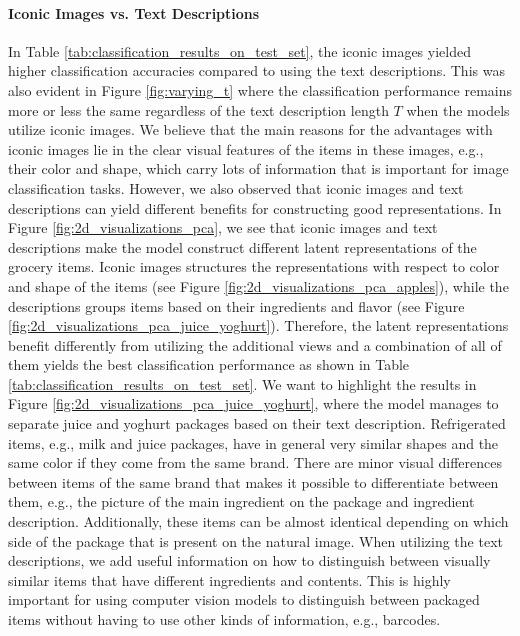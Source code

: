 \paragraph{Iconic Images vs. Text Descriptions} 
In Table \ref{tab:classification_results_on_test_set}, the iconic images yielded higher classification accuracies compared to using the text descriptions. This was also evident in Figure \ref{fig:varying_t} where the classification performance remains more or less the same regardless of the text description length $T$ when the models utilize iconic images. We believe that the main reasons for the advantages with iconic images lie in the clear visual features of the items in these images, e.g., their color and shape, which carry lots of information that is important for image classification tasks. However, we also observed that iconic images and text descriptions can yield different benefits for constructing good representations. In Figure \ref{fig:2d_visualizations_pca}, we see that iconic images and text descriptions make the model construct different latent representations of the grocery items. Iconic images structures the representations with respect to color and shape of the items (see Figure \ref{fig:2d_visualizations_pca_apples}), while the descriptions groups items based on their ingredients and flavor (see Figure \ref{fig:2d_visualizations_pca_juice_yoghurt}). Therefore, the latent representations benefit differently from utilizing the additional views and a combination of all of them yields the best classification performance as shown in Table \ref{tab:classification_results_on_test_set}. We want to highlight the results in Figure \ref{fig:2d_visualizations_pca_juice_yoghurt}, where the model manages to separate juice and yoghurt packages based on their text description. 
Refrigerated items, e.g., milk and juice packages, have in general very similar shapes and the same color if they come from the same brand.
There are minor visual differences between items of the same brand that makes it possible to differentiate between them, e.g., the picture of the main ingredient on the package and ingredient description. Additionally, these items can be almost identical depending on which side of the package that is present on the natural image. When utilizing the text descriptions, we add useful information on how to distinguish between visually similar items that have different ingredients and contents. This is highly important for using computer vision models to distinguish between packaged items without having to use other kinds of information, e.g., barcodes. 

